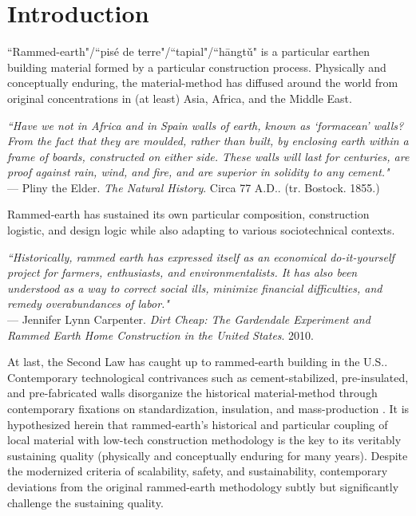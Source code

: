 \section{Introduction}


``Rammed-earth"/``pis\'e de terre"/``tapial"/``h\=angt\v u" is a particular earthen building material formed by a particular construction process. Physically and conceptually enduring, the material-method has diffused around the world from original concentrations in (at least) Asia, Africa, and the Middle East. \cite{RAMMEDEARTHHOUSE}

\begin{flushright}
\small{
\textit{``Have we not in Africa and in Spain walls of earth, known as `formacean' walls? From the fact that they are moulded, rather than built, by enclosing earth within a frame of boards, constructed on either side. These walls will last for centuries, are proof against rain, wind, and fire, and are superior in solidity to any cement."}}\\ --- Pliny the Elder. \textit{The Natural History}. Circa 77 A.D.. (tr. Bostock. 1855.)
\end{flushright}

Rammed-earth has sustained its own particular composition, construction logistic, and design logic while also adapting to various sociotechnical contexts.

\begin{flushright}
\small{
\textit{
``Historically, rammed earth has expressed itself as an economical do-it-yourself project for farmers, enthusiasts, and environmentalists. It has also been understood as a way to correct social ills, minimize financial difficulties, and remedy overabundances of labor."}}\\ --- Jennifer Lynn Carpenter. \textit{Dirt Cheap: The Gardendale Experiment and Rammed Earth Home Construction in the United States}. 2010.
\end{flushright}

At last, the Second Law has caught up to rammed-earth building in the U.S.. Contemporary technological contrivances such as cement-stabilized, pre-insulated, and pre-fabricated walls disorganize the historical material-method through contemporary fixations on standardization, insulation, and mass-production \cite{MOECONVERGENCE}. It is hypothesized herein that rammed-earth's historical and particular coupling of local material with low-tech construction methodology is the key to its veritably sustaining quality (physically and conceptually enduring for many years). Despite the modernized  criteria of scalability, safety, and sustainability, contemporary deviations from the original rammed-earth methodology subtly but significantly challenge the sustaining quality.

